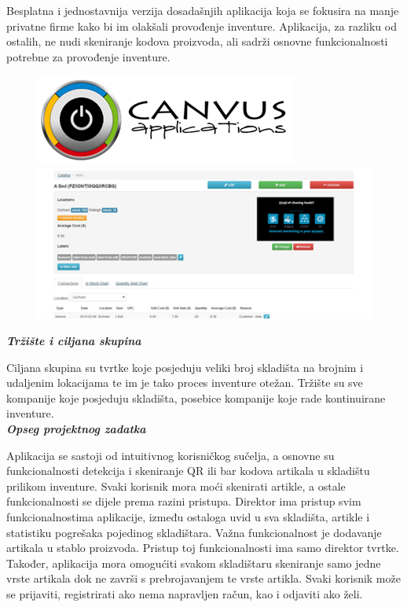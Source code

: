 		
		Besplatna i jednostavnija verzija dosadašnjih aplikacija koja se fokusira na manje privatne firme kako bi im olakšali provođenje inventure. Aplikacija, za razliku od ostalih, ne nudi skeniranje kodova proizvoda, ali sadrži osnovne funkcionalnosti potrebne za provođenje inventure.
		
		\begin{figure}[H]
			\includegraphics[width=0.49\linewidth]{slike/ST_logo.png}
			\includegraphics[width=0.49\linewidth]{slike/ST_slika.png}
			\centering
			\label{st_logo}
		\end{figure}
		
		\bigskip
				
		\large\textbf{\textit{Tržište i ciljana skupina}}\normalsize
		
		Ciljana skupina su tvrtke koje posjeduju veliki broj skladišta na brojnim i udaljenim lokacijama te im je tako proces inventure otežan. Tržište su sve kompanije koje posjeduju skladišta, posebice kompanije koje rade kontinuirane inventure.\\
		
		\large\textbf{\textit{Opseg projektnog zadatka}}\normalsize
		
		Aplikacija se sastoji od intuitivnog korisničkog sučelja, a osnovne su funkcionalnosti detekcija i skeniranje QR ili bar kodova artikala u skladištu prilikom inventure. Svaki korisnik mora moći skenirati artikle, a ostale funkcionalnosti se dijele prema razini pristupa. Direktor ima pristup svim funkcionalnostima aplikacije, između ostaloga uvid u sva skladišta, artikle i statistiku pogrešaka pojedinog skladištara. Važna funkcionalnost je dodavanje artikala u stablo proizvoda. Pristup toj funkcionalnosti ima samo direktor tvrtke. Također, aplikacija mora omogućiti svakom skladištaru skeniranje samo jedne vrste artikala dok ne završi s prebrojavanjem te vrste artikla. Svaki korisnik može se prijaviti, registrirati ako nema napravljen račun, kao i odjaviti ako želi.\\
		
